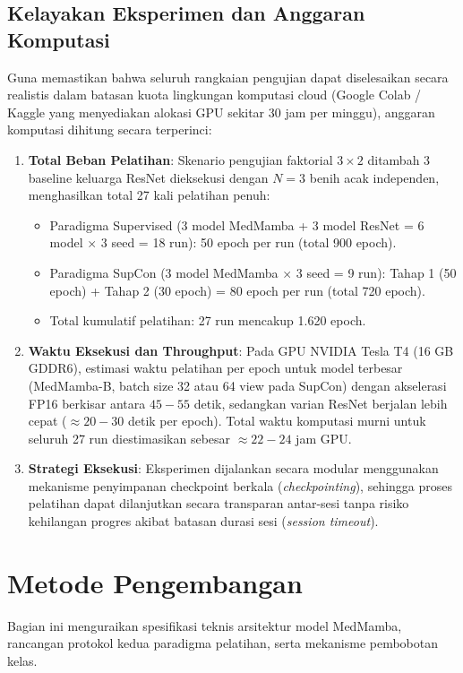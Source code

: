 \subsection{Kelayakan Eksperimen dan Anggaran Komputasi} \label{III.AnggaranKomputasi}
Guna memastikan bahwa seluruh rangkaian pengujian dapat diselesaikan secara realistis dalam batasan kuota lingkungan komputasi cloud (Google Colab / Kaggle yang menyediakan alokasi GPU sekitar 30 jam per minggu), anggaran komputasi dihitung secara terperinci:
\begin{enumerate}[noitemsep]
	\item \textbf{Total Beban Pelatihan}: Skenario pengujian faktorial $3 \times 2$ ditambah 3 baseline keluarga ResNet dieksekusi dengan $N=3$ benih acak independen, menghasilkan total 27 kali pelatihan penuh:
	\begin{itemize}[noitemsep]
		\item Paradigma Supervised (3 model MedMamba + 3 model ResNet = 6 model $\times$ 3 seed = 18 run): 50 epoch per run (total 900 epoch).
		\item Paradigma SupCon (3 model MedMamba $\times$ 3 seed = 9 run): Tahap 1 (50 epoch) + Tahap 2 (30 epoch) = 80 epoch per run (total 720 epoch).
		\item Total kumulatif pelatihan: 27 run mencakup 1.620 epoch.
	\end{itemize}
	\item \textbf{Waktu Eksekusi dan Throughput}: Pada GPU NVIDIA Tesla T4 (16 GB GDDR6), estimasi waktu pelatihan per epoch untuk model terbesar (MedMamba-B, batch size 32 atau 64 view pada SupCon) dengan akselerasi FP16 berkisar antara $45 - 55$ detik, sedangkan varian ResNet berjalan lebih cepat ($\approx 20 - 30$ detik per epoch). Total waktu komputasi murni untuk seluruh 27 run diestimasikan sebesar $\approx 22 - 24$ jam GPU.
	\item \textbf{Strategi Eksekusi}: Eksperimen dijalankan secara modular menggunakan mekanisme penyimpanan checkpoint berkala (\textit{checkpointing}), sehingga proses pelatihan dapat dilanjutkan secara transparan antar-sesi tanpa risiko kehilangan progres akibat batasan durasi sesi (\textit{session timeout}).
\end{enumerate}

\section{Metode Pengembangan} \label{III.Metode}
Bagian ini menguraikan spesifikasi teknis arsitektur model MedMamba, rancangan protokol kedua paradigma pelatihan, serta mekanisme pembobotan kelas. \par

